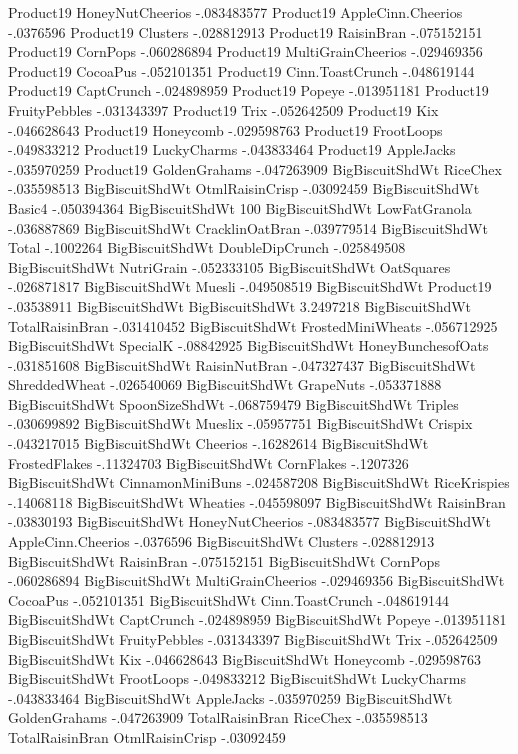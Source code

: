 Product19	HoneyNutCheerios	-.083483577
Product19	AppleCinn.Cheerios	-.0376596
Product19	Clusters	-.028812913
Product19	RaisinBran	-.075152151
Product19	CornPops	-.060286894
Product19	MultiGrainCheerios	-.029469356
Product19	CocoaPus	-.052101351
Product19	Cinn.ToastCrunch	-.048619144
Product19	CaptCrunch	-.024898959
Product19	Popeye	-.013951181
Product19	FruityPebbles	-.031343397
Product19	Trix	-.052642509
Product19	Kix	-.046628643
Product19	Honeycomb	-.029598763
Product19	FrootLoops	-.049833212
Product19	LuckyCharms	-.043833464
Product19	AppleJacks	-.035970259
Product19	GoldenGrahams	-.047263909
BigBiscuitShdWt	RiceChex	-.035598513
BigBiscuitShdWt	OtmlRaisinCrisp	-.03092459
BigBiscuitShdWt	Basic4	-.050394364
BigBiscuitShdWt	100%
BigBiscuitShdWt	LowFatGranola	-.036887869
BigBiscuitShdWt	CracklinOatBran	-.039779514
BigBiscuitShdWt	Total	-.1002264
BigBiscuitShdWt	DoubleDipCrunch	-.025849508
BigBiscuitShdWt	NutriGrain	-.052333105
BigBiscuitShdWt	OatSquares	-.026871817
BigBiscuitShdWt	Muesli	-.049508519
BigBiscuitShdWt	Product19	-.03538911
BigBiscuitShdWt	BigBiscuitShdWt	3.2497218
BigBiscuitShdWt	TotalRaisinBran	-.031410452
BigBiscuitShdWt	FrostedMiniWheats	-.056712925
BigBiscuitShdWt	SpecialK	-.08842925
BigBiscuitShdWt	HoneyBunchesofOats	-.031851608
BigBiscuitShdWt	RaisinNutBran	-.047327437
BigBiscuitShdWt	ShreddedWheat	-.026540069
BigBiscuitShdWt	GrapeNuts	-.053371888
BigBiscuitShdWt	SpoonSizeShdWt	-.068759479
BigBiscuitShdWt	Triples	-.030699892
BigBiscuitShdWt	Mueslix	-.05957751
BigBiscuitShdWt	Crispix	-.043217015
BigBiscuitShdWt	Cheerios	-.16282614
BigBiscuitShdWt	FrostedFlakes	-.11324703
BigBiscuitShdWt	CornFlakes	-.1207326
BigBiscuitShdWt	CinnamonMiniBuns	-.024587208
BigBiscuitShdWt	RiceKrispies	-.14068118
BigBiscuitShdWt	Wheaties	-.045598097
BigBiscuitShdWt	RaisinBran	-.03830193
BigBiscuitShdWt	HoneyNutCheerios	-.083483577
BigBiscuitShdWt	AppleCinn.Cheerios	-.0376596
BigBiscuitShdWt	Clusters	-.028812913
BigBiscuitShdWt	RaisinBran	-.075152151
BigBiscuitShdWt	CornPops	-.060286894
BigBiscuitShdWt	MultiGrainCheerios	-.029469356
BigBiscuitShdWt	CocoaPus	-.052101351
BigBiscuitShdWt	Cinn.ToastCrunch	-.048619144
BigBiscuitShdWt	CaptCrunch	-.024898959
BigBiscuitShdWt	Popeye	-.013951181
BigBiscuitShdWt	FruityPebbles	-.031343397
BigBiscuitShdWt	Trix	-.052642509
BigBiscuitShdWt	Kix	-.046628643
BigBiscuitShdWt	Honeycomb	-.029598763
BigBiscuitShdWt	FrootLoops	-.049833212
BigBiscuitShdWt	LuckyCharms	-.043833464
BigBiscuitShdWt	AppleJacks	-.035970259
BigBiscuitShdWt	GoldenGrahams	-.047263909
TotalRaisinBran	RiceChex	-.035598513
TotalRaisinBran	OtmlRaisinCrisp	-.03092459
